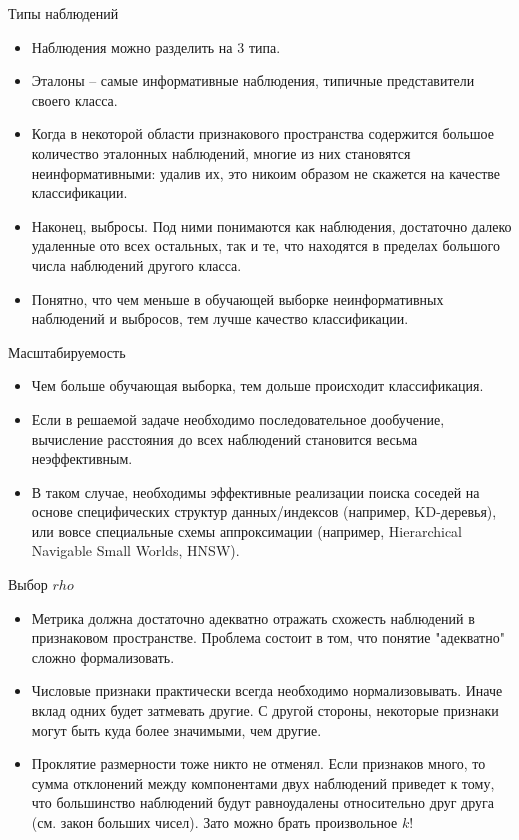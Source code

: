 \documentclass{beamer}
\begin{document}
\begin{frame}{Типы наблюдений}
    \small
    \begin{itemize}
        \item Наблюдения можно разделить на 3 типа.
        \item Эталоны -- самые информативные наблюдения, типичные представители своего класса. 
        \item Когда в некоторой области признакового пространства содержится большое количество эталонных наблюдений, многие из них становятся неинформативными: удалив их, это никоим образом не скажется на качестве классификации.
        \item Наконец, выбросы. Под ними понимаются как наблюдения, достаточно далеко удаленные ото всех остальных, так и те, что находятся в пределах большого числа наблюдений другого класса.
        \item Понятно, что чем меньше в обучающей выборке неинформативных наблюдений и выбросов, тем лучше качество классификации.
    \end{itemize}
\end{frame}

\begin{frame}{Масштабируемость}
    \small
    \begin{itemize}
        \item Чем больше обучающая выборка, тем дольше происходит классификация.
        \item Если в решаемой задаче необходимо последовательное дообучение, вычисление расстояния до всех наблюдений становится весьма неэффективным.
        \item В таком случае, необходимы эффективные реализации поиска соседей на основе специфических структур данных/индексов (например, KD-деревья), или вовсе специальные схемы аппроксимации (например, Hierarchical Navigable Small Worlds, HNSW).
    \end{itemize}
\end{frame}

\begin{frame}{Выбор $rho$}
    \small
    \begin{itemize}
        \item Метрика должна достаточно адекватно отражать схожесть наблюдений в признаковом пространстве. Проблема состоит в том, что понятие "адекватно" сложно формализовать.
        \item Числовые признаки практически всегда необходимо нормализовывать. Иначе вклад одних будет затмевать другие. С другой стороны, некоторые признаки могут быть куда более значимыми, чем другие. 
        \item Проклятие размерности тоже никто не отменял. Если признаков много, то сумма отклонений между компонентами двух наблюдений приведет к тому, что большинство наблюдений будут равноудалены относительно друг друга (см. закон больших чисел). Зато можно брать произвольное $k$!
    \end{itemize}
\end{frame}
\end{document}
